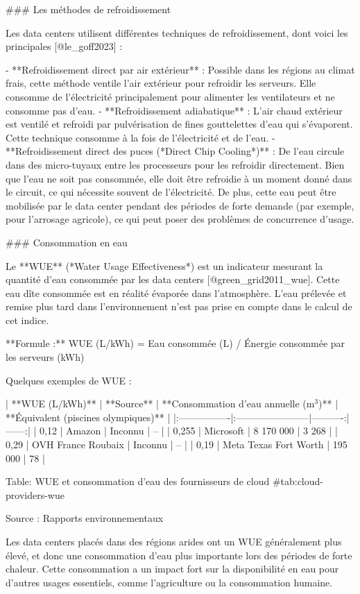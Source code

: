 ### Les méthodes de refroidissement

Les data centers utilisent différentes techniques de refroidissement, dont voici les principales [@le_goff2023] :

- **Refroidissement direct par air extérieur** :
Possible dans les régions au climat frais, cette méthode ventile l'air extérieur pour refroidir les serveurs. Elle consomme de l'électricité principalement pour alimenter les ventilateurs et ne consomme pas d'eau.
- **Refroidissement adiabatique** :
L'air chaud extérieur est ventilé et refroidi par pulvérisation de fines gouttelettes d'eau qui s'évaporent. Cette technique consomme à la fois de l'électricité et de l'eau.
- **Refroidissement direct des puces (*Direct Chip Cooling*)** :
De l'eau circule dans des micro-tuyaux entre les processeurs pour les refroidir directement. Bien que l'eau ne soit pas consommée, elle doit être refroidie à un moment donné dans le circuit, ce qui nécessite souvent de l'électricité. De plus, cette eau peut être mobilisée par le data center pendant des périodes de forte demande (par exemple, pour l'arrosage agricole), ce qui peut poser des problèmes de concurrence d'usage.

### Consommation en eau

Le **WUE** (*Water Usage Effectiveness*) est un indicateur mesurant la quantité d'eau consommée par les data centers [@green_grid2011_wue].
Cette eau dîte consommée est en réalité évaporée dans l'atmosphère. L'eau prélevée et remise plus tard dans l'environnement n'est pas prise en compte dans le calcul de cet indice.

**Formule :** WUE (L/kWh) = Eau consommée (L) / Énergie consommée par les serveurs (kWh)

Quelques exemples de WUE :

| **WUE (L/kWh)** | **Source** | **Consommation d'eau annuelle (m$^3$)** | **Équivalent (piscines olympiques)** |
|:----------------|:-----------------------|----------:|------:|
| 0,12  | Amazon                | Inconnu   | --    |
| 0,255 | Microsoft             | 8 170 000 | 3 268 |
| 0,29  | OVH France Roubaix    | Inconnu   | --    |
| 0,19  | Meta Texas Fort Worth | 195 000   | 78    |

Table: WUE et consommation d'eau des fournisseurs de cloud {#tab:cloud-providers-wue}

Source : Rapports environnementaux

Les data centers placés dans des régions arides ont un WUE généralement plus élevé, et donc une consommation d'eau plus importante lors des périodes de forte chaleur. Cette consommation a un impact fort sur la disponibilité en eau pour d'autres usages essentiels, comme l'agriculture ou la consommation humaine.

